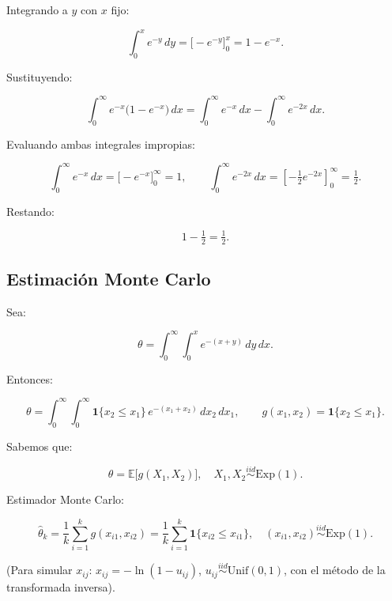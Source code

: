 \documentclass[10pt,a4paper]{article} %
\begin{document}
Integrando a \(y\) con \(x\) fijo:

\[
\int_{0}^{x} e^{-y}\,dy=\big[-e^{-y}\big]_{0}^{x}=1-e^{-x}.
\]

Sustituyendo:

\[
\int_{0}^{\infty} e^{-x}\big(1-e^{-x}\big)\,dx
=\int_{0}^{\infty} e^{-x}\,dx-\int_{0}^{\infty} e^{-2x}\,dx.
\]

Evaluando ambas integrales impropias:

\[
\int_{0}^{\infty} e^{-x}\,dx=\big[-e^{-x}\big]_{0}^{\infty}=1,\qquad
\int_{0}^{\infty} e^{-2x}\,dx=\left[-\tfrac{1}{2}e^{-2x}\right]_{0}^{\infty}=\tfrac{1}{2}.
\]

Restando:

\[
1-\tfrac{1}{2}=\tfrac{1}{2}.
\]

    \hypertarget{estimaciuxf3n-monte-carlo}{%
\subsection{Estimación Monte Carlo}\label{estimaciuxf3n-monte-carlo}}

Sea:

\[
\theta=\int_{0}^{\infty}\!\!\int_{0}^{x} e^{-(x+y)}\,dy\,dx.
\]

Entonces:

\[
\theta=\int_{0}^{\infty}\!\!\int_{0}^{\infty}\mathbf{1}\{x_2\le x_1\}\,e^{-(x_1+x_2)}\,dx_2\,dx_1,
\qquad g(x_1,x_2)=\mathbf{1}\{x_2\le x_1\}.
\]

Sabemos que:

\[
\theta=\mathbb{E}\big[g(X_1,X_2)\big],\quad X_1,X_2\stackrel{iid}{\sim}\mathrm{Exp}(1).
\]

Estimador Monte Carlo:

\[
\widehat{\theta}_k=\frac{1}{k}\sum_{i=1}^{k} g(x_{i1},x_{i2})
=\frac{1}{k}\sum_{i=1}^{k}\mathbf{1}\{x_{i2}\le x_{i1}\},
\quad (x_{i1},x_{i2})\stackrel{iid}{\sim}\mathrm{Exp}(1).
\]

(Para simular \(x_{ij}\): \(x_{ij}=-\ln(1-u_{ij})\),
\(u_{ij}\stackrel{iid}{\sim}\mathrm{Unif}(0,1)\), con el método de la
transformada inversa).
\end{document}
